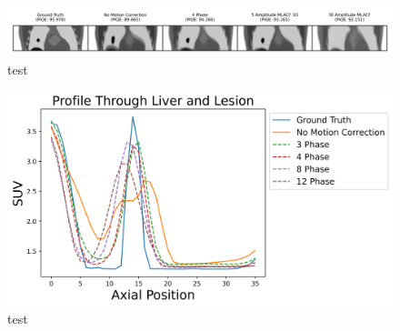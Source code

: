             \begin{figure}
                \centering
                
                \includegraphics[width=1.0\linewidth]{figures/motion_correction_2_results_2_noiseless_best_visual_analysis.png}
                
                \captionsetup{singlelinecheck=false}
                \caption{
                    test
                }
                
                \label{fig:test_noiseless_best_visual_analysis}
            \end{figure}
            
            \begin{figure}
                \centering
                
                \includegraphics[width=1.0\linewidth]{figures/motion_correction_2_results_2_phase_profile.png}
                
                \captionsetup{singlelinecheck=false}
                \caption{
                    test
                }
                
                \label{fig:test_phase_profile}
            \end{figure}

